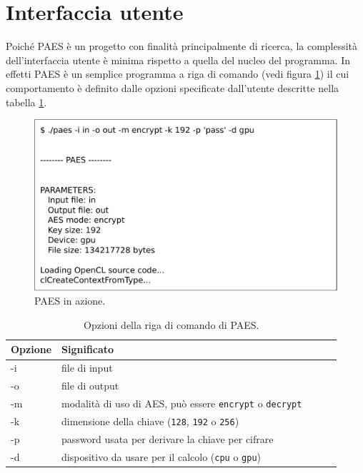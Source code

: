 \documentclass[12pt,a4paper,oneside]{book}
\begin{document}
\section{Interfaccia utente}
\label{sec:paes-cli}

Poiché PAES è un progetto con finalità principalmente di ricerca, la complessità dell'interfaccia utente è minima rispetto a quella del nucleo del programma. In effetti PAES è un semplice programma a riga di comando (vedi figura \ref{fig:paes-screenshot}) il cui comportamento è definito dalle opzioni specificate dall'utente descritte nella tabella \ref{tab:paes-opzioni}.

\begin{figure}[h]
\begin{center}
\includegraphics[width=\textwidth]{img/paes-screenshot}
\caption{PAES in azione.\label{fig:paes-screenshot}}
\end{center}
\end{figure}

\begin{table}[h]
\begin{center}
\begin{tabular}{|l|l|l|l|l|}
\hline
\textbf{Opzione} &  \textbf{Significato} \\
\hline
-i & file di input \\
\hline
-o & file di output \\
\hline
-m & modalità di uso di \ac{AES}, può essere \verb|encrypt| o \verb|decrypt| \\
\hline
-k & dimensione della chiave (\verb|128|, \verb|192| o \verb|256|) \\
\hline
-p & password usata per derivare la chiave per cifrare \\
\hline
-d & dispositivo da usare per il calcolo (\verb|cpu| o \verb|gpu|) \\
\hline
\end{tabular}
\caption{Opzioni della riga di comando di PAES.\label{tab:paes-opzioni}}
\end{center}
\end{table}
\end{document}

